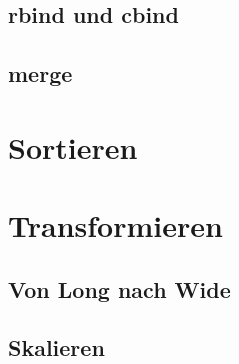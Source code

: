 \documentclass[
]{book}
\begin{document}
\hypertarget{rbind-und-cbind}{%
\subsection{rbind und cbind}\label{rbind-und-cbind}}

\hypertarget{merge}{%
\subsection{merge}\label{merge}}

\hypertarget{sortieren}{%
\section{Sortieren}\label{sortieren}}

\hypertarget{transformieren}{%
\section{Transformieren}\label{transformieren}}

\hypertarget{von-long-nach-wide}{%
\subsection{Von Long nach Wide}\label{von-long-nach-wide}}

\hypertarget{skalieren}{%
\subsection{Skalieren}\label{skalieren}}

  
\end{document}
